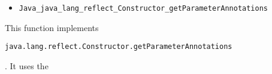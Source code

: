 \documentclass[a4paper, 10pt, titlepage]{scrartcl} %
\begin{document}
\begin{itemize}
 \item \begin{scriptsize}\verb|Java_java_lang_reflect_Constructor_getParameterAnnotations|\end{scriptsize}
\end{itemize}
This function implements
\begin{scriptsize}\verb|java|\hspace{0.0pt}\verb|.|\hspace{0.0pt}\verb|lang|\hspace{0.0pt}\verb|.|\hspace{0.0pt}\verb|reflect|\hspace{0.0pt}\verb|.|\hspace{0.0pt}\verb|Constructor|\hspace{0.0pt}\verb|.|\hspace{0.0pt}\verb|getParameterAnnotations|\end{scriptsize}. It uses the
\end{document}
